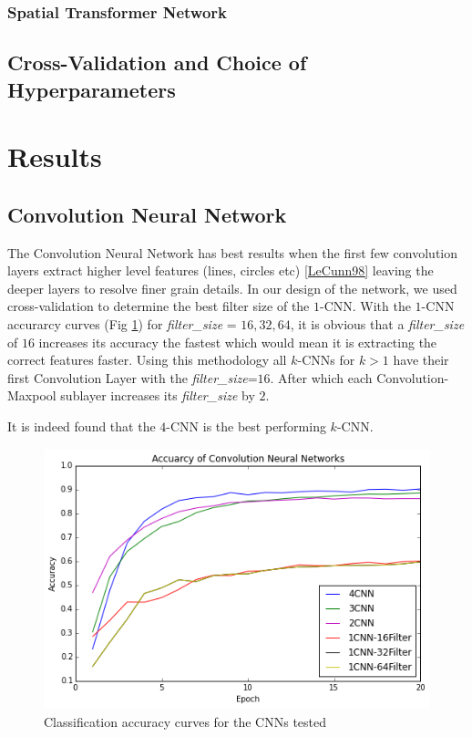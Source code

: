 \documentclass[conference]{IEEEtran}
\begin{document}
\subsubsection{Spatial Transformer Network}

\subsection{Cross-Validation and Choice of Hyperparameters}

\section{Results}
\subsection{Convolution Neural Network}
The Convolution Neural Network has best results when the first few convolution layers extract higher level features (lines, circles etc) \ref{LeCunn98} leaving the deeper layers to resolve finer grain details. In our design of the network, we used cross-validation to determine the best filter size of the $1$-CNN. With the $1$-CNN accurarcy curves (Fig  \ref{CNN-ROC}) for \emph{filter\_size} = $16, 32, 64$, it is obvious that a \emph{filter\_size} of $16$ increases its accuracy the fastest which would mean it is extracting the correct features faster. Using this methodology all $k$-CNNs for $k>1$ have their first Convolution Layer with the \emph{filter\_size}=$16$. After which each Convolution-Maxpool sublayer increases its \emph{filter\_size} by $2$. 

It is indeed found that the $4$-CNN is the best performing $k$-CNN.

\begin{figure}[h]
	\includegraphics[scale=0.5]{acc.png}
	\caption{Classification accuracy curves for the CNNs tested}
	\label{CNN-ROC}
\end{figure}
\end{document}
